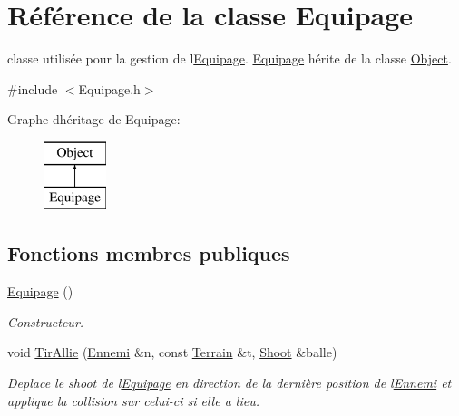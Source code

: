 \hypertarget{class_equipage}{}\section{Référence de la classe Equipage}
\label{class_equipage}


classe utilisée pour la gestion de l\textquotesingle{}\hyperlink{class_equipage}{Equipage}. \hyperlink{class_equipage}{Equipage} hérite de la classe \hyperlink{class_object}{Object}.  




{\ttfamily \#include $<$Equipage.\+h$>$}

Graphe d\textquotesingle{}héritage de Equipage\+:\begin{figure}[H]
\begin{center}
\leavevmode
\includegraphics[height=2.000000cm]{class_equipage}
\end{center}
\end{figure}
\subsection*{Fonctions membres publiques}
\begin{DoxyCompactItemize}
\item 
\hyperlink{class_equipage_a25d4958c4ad1d69eebe6b4e434794e07}{Equipage} ()
\begin{DoxyCompactList}\small\item\em Constructeur. \end{DoxyCompactList}\item 
void \hyperlink{class_equipage_a2836ad0ea4c1f329ee3f9b88517f9d66}{Tir\+Allie} (\hyperlink{class_ennemi}{Ennemi} \&n, const \hyperlink{class_terrain}{Terrain} \&t, \hyperlink{class_shoot}{Shoot} \&balle)
\begin{DoxyCompactList}\small\item\em Deplace le shoot de l\textquotesingle{}\hyperlink{class_equipage}{Equipage} en direction de la dernière position de l\textquotesingle{}\hyperlink{class_ennemi}{Ennemi} et applique la collision sur celui-\/ci si elle a lieu. \end{DoxyCompactList}\end{DoxyCompactItemize}


